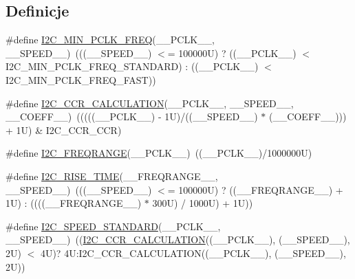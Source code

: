 \subsection*{Definicje}
\begin{DoxyCompactItemize}
\item 
\#define \hyperlink{group___i2_c___private___macros_ga30bf3d43ca9c1d9eb665bda03d84ec4a}{I2\+C\+\_\+\+M\+I\+N\+\_\+\+P\+C\+L\+K\+\_\+\+F\+R\+EQ}(\+\_\+\+\_\+\+P\+C\+L\+K\+\_\+\+\_\+,  \+\_\+\+\_\+\+S\+P\+E\+E\+D\+\_\+\+\_\+)~(((\+\_\+\+\_\+\+S\+P\+E\+E\+D\+\_\+\+\_\+) $<$= 100000\+U) ? ((\+\_\+\+\_\+\+P\+C\+L\+K\+\_\+\+\_\+) $<$ I2\+C\+\_\+\+M\+I\+N\+\_\+\+P\+C\+L\+K\+\_\+\+F\+R\+E\+Q\+\_\+\+S\+T\+A\+N\+D\+A\+R\+D) \+: ((\+\_\+\+\_\+\+P\+C\+L\+K\+\_\+\+\_\+) $<$ I2\+C\+\_\+\+M\+I\+N\+\_\+\+P\+C\+L\+K\+\_\+\+F\+R\+E\+Q\+\_\+\+F\+A\+S\+T))
\item 
\#define \hyperlink{group___i2_c___private___macros_ga647da9b3c71c56e2e1b49417bc557233}{I2\+C\+\_\+\+C\+C\+R\+\_\+\+C\+A\+L\+C\+U\+L\+A\+T\+I\+ON}(\+\_\+\+\_\+\+P\+C\+L\+K\+\_\+\+\_\+,  \+\_\+\+\_\+\+S\+P\+E\+E\+D\+\_\+\+\_\+,  \+\_\+\+\_\+\+C\+O\+E\+F\+F\+\_\+\+\_\+)~(((((\+\_\+\+\_\+\+P\+C\+L\+K\+\_\+\+\_\+) -\/ 1\+U)/((\+\_\+\+\_\+\+S\+P\+E\+E\+D\+\_\+\+\_\+) $\ast$ (\+\_\+\+\_\+\+C\+O\+E\+F\+F\+\_\+\+\_\+))) + 1\+U) \& I2\+C\+\_\+\+C\+C\+R\+\_\+\+C\+C\+R)
\item 
\#define \hyperlink{group___i2_c___private___macros_ga9b4e4686872c7b0bd9daed9049d0c431}{I2\+C\+\_\+\+F\+R\+E\+Q\+R\+A\+N\+GE}(\+\_\+\+\_\+\+P\+C\+L\+K\+\_\+\+\_\+)~((\+\_\+\+\_\+\+P\+C\+L\+K\+\_\+\+\_\+)/1000000\+U)
\item 
\#define \hyperlink{group___i2_c___private___macros_ga27cae7b1432cd160ab708e1548ba3165}{I2\+C\+\_\+\+R\+I\+S\+E\+\_\+\+T\+I\+ME}(\+\_\+\+\_\+\+F\+R\+E\+Q\+R\+A\+N\+G\+E\+\_\+\+\_\+,  \+\_\+\+\_\+\+S\+P\+E\+E\+D\+\_\+\+\_\+)~(((\+\_\+\+\_\+\+S\+P\+E\+E\+D\+\_\+\+\_\+) $<$= 100000\+U) ? ((\+\_\+\+\_\+\+F\+R\+E\+Q\+R\+A\+N\+G\+E\+\_\+\+\_\+) + 1\+U) \+: ((((\+\_\+\+\_\+\+F\+R\+E\+Q\+R\+A\+N\+G\+E\+\_\+\+\_\+) $\ast$ 300\+U) / 1000\+U) + 1\+U))
\item 
\#define \hyperlink{group___i2_c___private___macros_gaa71590c93b126e79fc86afbc819742b3}{I2\+C\+\_\+\+S\+P\+E\+E\+D\+\_\+\+S\+T\+A\+N\+D\+A\+RD}(\+\_\+\+\_\+\+P\+C\+L\+K\+\_\+\+\_\+,  \+\_\+\+\_\+\+S\+P\+E\+E\+D\+\_\+\+\_\+)~((\hyperlink{group___i2_c___private___macros_ga647da9b3c71c56e2e1b49417bc557233}{I2\+C\+\_\+\+C\+C\+R\+\_\+\+C\+A\+L\+C\+U\+L\+A\+T\+I\+ON}((\+\_\+\+\_\+\+P\+C\+L\+K\+\_\+\+\_\+), (\+\_\+\+\_\+\+S\+P\+E\+E\+D\+\_\+\+\_\+), 2\+U) $<$ 4\+U)? 4\+U\+:\+I2\+C\+\_\+\+C\+C\+R\+\_\+\+C\+A\+L\+C\+U\+L\+A\+T\+I\+O\+N((\+\_\+\+\_\+\+P\+C\+L\+K\+\_\+\+\_\+), (\+\_\+\+\_\+\+S\+P\+E\+E\+D\+\_\+\+\_\+), 2\+U))

\end{DoxyCompactItemize}
